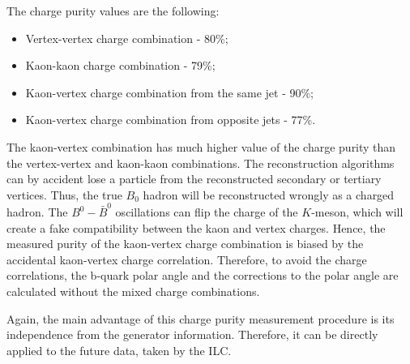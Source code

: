 The charge purity values are the following:
\begin{itemize}
	\item Vertex-vertex charge combination - 80\%;
	\item Kaon-kaon charge combination  - 79\%;
	\item Kaon-vertex charge combination from the same jet - 90\%;
	\item Kaon-vertex charge combination from opposite jets - 77\%.
\end{itemize}
The kaon-vertex combination has much higher value of the charge purity than the vertex-vertex and kaon-kaon combinations. 
The reconstruction algorithms can by accident lose a particle from the reconstructed secondary or tertiary vertices. 
Thus, the true $B_0$ hadron will be reconstructed wrongly as a charged hadron.
The $B^0-\bar{B}^0$ oscillations can flip the charge of the $K$-meson, which will create a fake compatibility between the kaon and vertex charges.
Hence, the measured purity of the kaon-vertex charge combination is biased by the accidental kaon-vertex charge correlation.
Therefore, to avoid the charge correlations, the b-quark polar  angle and the corrections to the polar angle are calculated without the mixed charge combinations.

Again, the main advantage of this charge purity measurement procedure is its independence from the generator information. 
Therefore, it can be directly applied to the future data, taken by the ILC.


